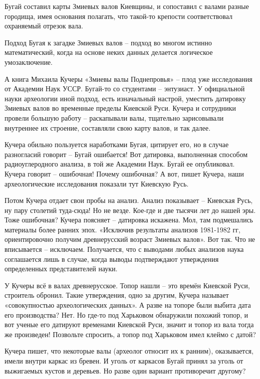 Бугай составил карты Змиевых валов Киевщины, и сопоставил с валами разные городища, имея основания полагать, что такой-то крепости соответствовал охраняемый отрезок вала.

Подход Бугая к загадке Змиевых валов – подход во многом истинно математический, когда на основе неких данных делается логическое умозаключение.

А книга Михаила Кучеры «Змиевы валы Поднепровья» – плод уже исследования от Академии Наук УССР. Бугай-то со студентами – энтузиаст. У официальной науки археологии иной подход, есть изначальный настрой, уместить датировку Змиевых валов во временные пределы Киевской Руси. Кучера и сотрудники провели большую работу –  раскапывали валы, тщательно зарисовывали внутреннее их строение, составляли свою карту валов, и так далее.

Кучера обильно пользуется наработками Бугая, цитирует его, но в случае разногласий говорит – Бугай ошибается! Вот датировка, выполненная способом радиоуглеродного анализа, в той же Академии Наук. Бугай ее опубликовал. Кучера говорит – ошибочная! Почему ошибочная? А вот, пишет Кучера, наши археологические исследования показали тут Киевскую Русь.

Потом Кучера отдает свои пробы на анализ. Анализ показывает – Киевская Русь, ну пару столетий туда-сюда! Но не везде. Кое-где и две тысячи лет до нашей эры. Тоже ошибочная? Кучера поясняет – датировка искажена. Мол, там подмешались материалы более ранних эпох. «Исключив результаты анализов 1981-1982 гг, ориентировочно получим древнерусский возраст Змиевых валов». Вот так. Что не вписывается – исключаем. Получается, что с выводами любых анализов наука соглашается лишь в случае, когда выводы подтверждают утверждения определенных представителей науки.

У Кучеры всё в валах древнерусское. Топор нашли – это времён Киевской Руси, строитель обронил. Такие утверждения, одно за другим, Кучера называет «совокупностью археологических данных». А разве на топоре были выбита дата его производства? Нет. Но где-то под Харьковом обнаружили похожий топор, и вот ученые его датируют временами Киевской Руси, значит и топор из вала тогда же произведен! Позвольте спросить, а топор под Харьковом имел клеймо с датой?

Кучера пишет, что некоторые валы (археолог относит их к ранним), оказывается, имели внутри каркас из бревен. И уголь от каркасов Бугай принял за уголь от выжигаемых кустов и деревьев. Но разве один вариант противоречит другому?

